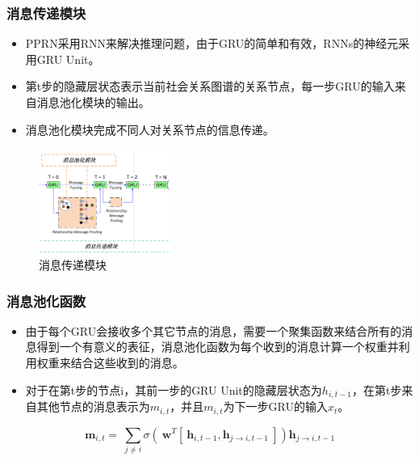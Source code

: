 \documentclass[UTF8]{beamer}
\begin{document}
\begin{frame}
    \frametitle{消息传递模块}
     \begin{block}{}
        \begin{itemize}
            \item PPRN采用RNN来解决推理问题，由于GRU的简单和有效，RNNs的神经元采用GRU Unit。
            \item 第t步的隐藏层状态表示当前社会关系图谱的关系节点，每一步GRU的输入来自消息池化模块的输出。
            \item 消息池化模块完成不同人对关系节点的信息传递。
        \end{itemize}
     \end{block}
    \begin{figure}
        \centering
        \includegraphics[width=0.38\textwidth]{images/mp.png}
        \caption{消息传递模块}
        \label{fig:PPRN}
    \end{figure}
\end{frame}

\begin{frame}
    \frametitle{消息池化函数}
    \begin{block}{}
        \begin{itemize}
            \item 由于每个GRU会接收多个其它节点的消息，需要一个聚集函数来结合所有的消息得到一个有意义的表征，消息池化函数为每个收到的消息计算一个权重并利用权重来结合这些收到的消息。
            \item 对于在第t步的节点i，其前一步的GRU Unit的隐藏层状态为$h_{i,t-1}$，在第t步来自其他节点的消息表示为$m_{i,t}$，并且$m_{i,t}$为下一步GRU的输入$x_t$。
        \end{itemize}
     \end{block}
     \small{
    \begin{equation}
        \label{eq:model-mp-atten}
    	\bm{m}_{i,t} = ~\sum_{j\neq i} \sigma{(~\bm{w}^T[~\bm{h}_{i,t-1},\bm{h}_{j \to i,t-1}~]) \bm{h}_{j \to i,t-1}}	
    \end{equation}
    }
\end{frame}
\end{document}
